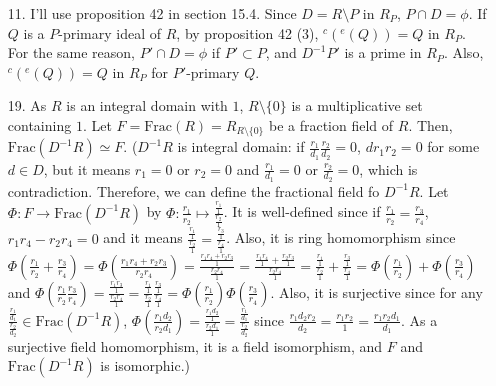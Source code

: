\documentclass[12pt]{article}
\begin{document}
\begin{enumerate}
\newpage
\item[11.] I'll use proposition 42 in section 15.4. Since $D=R\setminus P$ in $R_P$, $P\cap D=\phi$. If $Q$ is a $P$-primary ideal of $R$, by proposition 42 (3), $^{c}(^{e}(Q))=Q$ in $R_P$. For the same reason, $P'\cap D=\phi$ if $P'\subset P$, and $D^{-1}P'$ is a prime in $R_P$. Also, $^{c}(^{e}(Q))=Q$ in $R_P$ for $P'$-primary $Q$.
\newpage
\item[19.] As $R$ is an integral domain with $1$, $R\setminus\{0\}$ is a multiplicative set containing $1$. Let $F=\text{Frac}(R)=R_{R\setminus\{0\}}$ be a fraction field of $R$. Then, $\text{Frac}(D^{-1}R)\simeq F$. ($D^{-1}R$ is integral domain: if $\frac{r_1}{d_1}\frac{r_2}{d_2}=0$, $dr_1r_2=0$ for some $d\in D$, but it means $r_1=0$ or $r_2=0$ and $\frac{r_1}{d_1}=0$ or $\frac{r_2}{d_2}=0$, which is contradiction. Therefore, we can define the fractional field fo $D^{-1}R$. Let $\Phi:F\rightarrow \text{Frac}(D^{-1}R)$ by $\Phi:\frac{r_1}{r_2}\mapsto \frac{\frac{r_1}{1}}{\frac{r_2}{1}}$. It is well-defined since if $\frac{r_1}{r_2}=\frac{r_3}{r_4}$, $r_1r_4-r_2r_4=0$ and it means $\frac{\frac{r_1}{1}}{\frac{r_2}{1}}=\frac{\frac{r_3}{1}}{\frac{r_4}{1}}$. Also, it is ring homomorphism since $\Phi\left(\frac{r_1}{r_2}+\frac{r_3}{r_4}\right)=\Phi\left(\frac{r_1r_4+r_2r_3}{r_2r_4}\right)= \frac{\frac{r_1r_4+r_2r_3}{1}}{\frac{r_2r_4}{1}}=\frac{\frac{r_1r_4}{1}+\frac{r_2r_3}{1}}{\frac{r_2r_4}{1}}=\frac{\frac{r_1}{1}}{\frac{r_2}{1}}+\frac{\frac{r_3}{1}}{\frac{r_4}{1}}=\Phi\left(\frac{r_1}{r_2}\right)+\Phi\left(\frac{r_3}{r_4}\right)$ and $\Phi\left(\frac{r_1}{r_2}\frac{r_3}{r_4}\right)=\frac{\frac{r_1r_3}{1}}{\frac{r_2r_4}{1}}=\frac{\frac{r_1}{1}}{\frac{r_2}{1}}\frac{\frac{r_3}{1}}{\frac{r_4}{1}}=\Phi\left(\frac{r_1}{r_2}\right)\Phi\left(\frac{r_3}{r_4}\right)$. Also, it is surjective since for any $\frac{\frac{r_1}{d_1}}{\frac{r_2}{d_2}}\in \text{Frac}(D^{-1}R)$, $\Phi\left(\frac{r_1d_2}{r_2d_1}\right)=\frac{\frac{r_1d_2}{1}}{\frac{r_2d_1}{1}}=\frac{\frac{r_1}{d_1}}{\frac{r_2}{d_2}}$ since $\frac{r_1d_2r_2}{d_2}=\frac{r_1r_2}{1}=\frac{r_1r_2d_1}{d_1}$. As a surjective field homomorphism, it is a field isomorphism, and $F$ and $\text{Frac}(D^{-1}R)$ is isomorphic.)


\end{enumerate}
\end{document}
